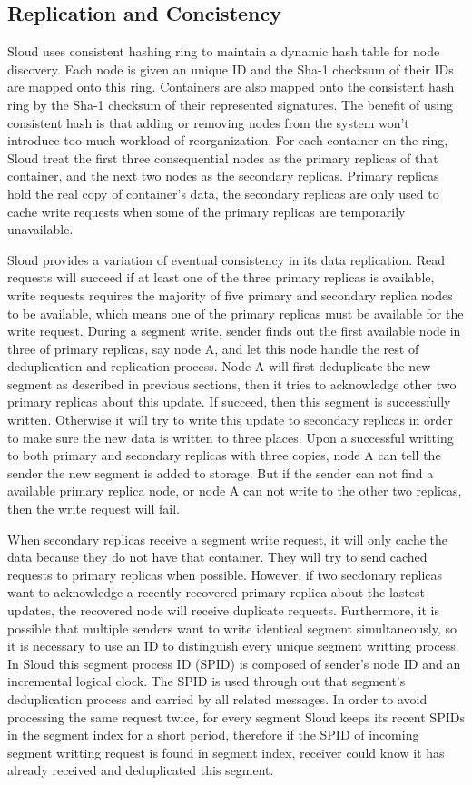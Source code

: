 \subsection{Replication and Concistency}
Sloud uses consistent hashing ring\cite{consistent_hash97} to maintain a dynamic hash table for node discovery. 
Each node is given an unique ID and the Sha-1 checksum of their IDs are mapped onto this ring. 
Containers are also mapped onto the consistent hash ring by the Sha-1 checksum of their represented signatures.
The benefit of using consistent hash is that adding or removing nodes from the system won't introduce too much
workload of reorganization. For each container on the ring, Sloud treat the first three consequential nodes as 
the primary replicas of that container, and the next two nodes as the secondary replicas. Primary replicas hold
the real copy of container's data, the secondary replicas are only used to cache write requests when some of the 
primary replicas are temporarily unavailable.

Sloud provides a variation of eventual consistency\cite{eventually09} in its data replication. Read
requests will succeed if at least one of the three primary replicas is available, write requests requires
the majority of five primary and secondary replica nodes to be available, which means one of the primary replicas
must be available for the write request.
During a segment write, sender finds out the first available node in three of primary replicas, say node A, 
and let this node handle the rest of deduplication and replication process. Node A will first deduplicate
the new segment as described in previous sections, then it tries to acknowledge other two primary replicas
about this update. If succeed, then this segment is successfully written. Otherwise it will
try to write this update to secondary replicas in order to make sure the new data is written to three places.
Upon a successful writting to both primary and secondary replicas with three copies, node A can tell the sender
the new segment is added to storage. But if the sender can not find a available primary replica node, or node A
can not write to the other two replicas, then the write request will fail.

When secondary replicas receive a segment write request, it will only cache the data because they do not have
that container. They will try to send cached requests to primary replicas when possible.
However, if two secdonary replicas want to acknowledge a recently recovered primary replica about the lastest updates,
the recovered node will receive duplicate requests.
Furthermore, it is possible that multiple senders want to write identical segment simultaneously, so it is necessary to use an ID
to distinguish every unique segment writting process.
In Sloud this segment process ID (SPID) is composed of sender's node ID and an incremental logical clock. The SPID is used through out that segment's
deduplication process and carried by all related messages.
In order to avoid processing the same request twice, for every segment Sloud keeps
its recent SPIDs in the segment index for a short period, therefore if the SPID of incoming segment writting request is found in segment index, 
receiver could know it has already received and deduplicated this segment.

